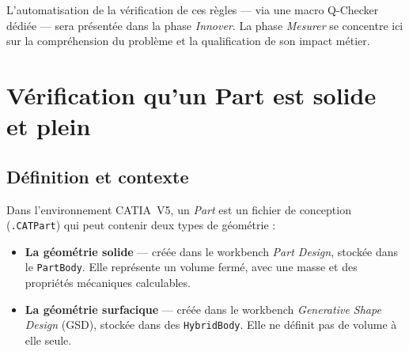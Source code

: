 \begin{block}[note]
L'automatisation de la vérification de ces règles --- via une macro Q-Checker dédiée --- sera présentée dans la phase \textit{Innover}. La phase \textit{Mesurer} se concentre ici sur la compréhension du problème et la qualification de son impact métier.
\end{block}

\section{Vérification qu'un Part est solide et plein}

\subsection{Définition et contexte}

Dans l'environnement CATIA~V5, un \textit{Part} est un fichier de conception (\texttt{.CATPart}) qui peut contenir deux types de géométrie :

\begin{itemize}
    \item[•] \textbf{La géométrie solide} --- créée dans le workbench \textit{Part Design}, stockée dans le \texttt{PartBody}. Elle représente un volume fermé, avec une masse et des propriétés mécaniques calculables.
    \item[•] \textbf{La géométrie surfacique} --- créée dans le workbench \textit{Generative Shape Design} (GSD), stockée dans des \texttt{HybridBody}. Elle ne définit pas de volume à elle seule.
\end{itemize}

